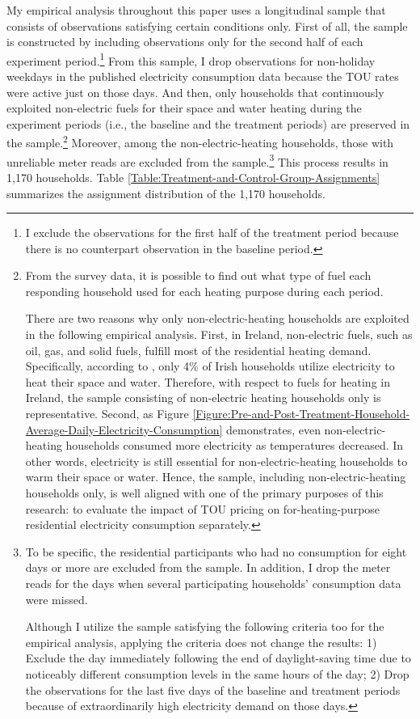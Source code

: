 My empirical analysis throughout this paper uses a longitudinal sample that consists of observations satisfying certain conditions only. First of all, the sample is constructed by including observations only for the second half of each experiment period.\footnote{I exclude the observations for the first half of the treatment period because there is no counterpart observation in the baseline period.} From this sample, I drop observations for non-holiday weekdays in the published electricity consumption data because the TOU rates were active just on those days. And then, only households that continuously exploited non-electric fuels for their space and water heating during the experiment periods (i.e., the baseline and the treatment periods) are preserved in the sample.\footnote{From the survey data, it is possible to find out what type of fuel each responding household used for each heating purpose during each period. \par
There are two reasons why only non-electric-heating households are exploited in the following empirical analysis. First, in Ireland, non-electric fuels, such as oil, gas, and solid fuels, fulfill most of the residential heating demand. Specifically, according to \cite{Heating-and-Cooling-in-Ireland-Today_SEAI_2022}, only 4\% of Irish households utilize electricity to heat their space and water. Therefore, with respect to fuels for heating in Ireland, the sample consisting of non-electric heating households only is representative. Second, as Figure \ref{Figure:Pre-and-Post-Treatment-Household-Average-Daily-Electricity-Consumption} demonstrates, even non-electric-heating households consumed more electricity as temperatures decreased. In other words, electricity is still essential for non-electric-heating households to warm their space or water. Hence, the sample, including non-electric-heating households only, is well aligned with one of the primary purposes of this research: to evaluate the impact of TOU pricing on for-heating-purpose residential electricity consumption separately.} Moreover, among the non-electric-heating households, those with unreliable meter reads are excluded from the sample.\footnote{To be specific, the residential participants who had no consumption for eight days or more are excluded from the sample. In addition, I drop the meter reads for the days when several participating households' consumption data were missed. \par
Although I utilize the sample satisfying the following criteria too for the empirical analysis, applying the criteria does not change the results: 1) Exclude the day immediately following the end of daylight-saving time due to noticeably different consumption levels in the same hours of the day; 2) Drop the observations for the last five days of the baseline and treatment periods because of extraordinarily high electricity demand on those days.} This process results in 1,170 households. Table \ref{Table:Treatment-and-Control-Group-Assignments} summarizes the assignment distribution of the 1,170 households.   

